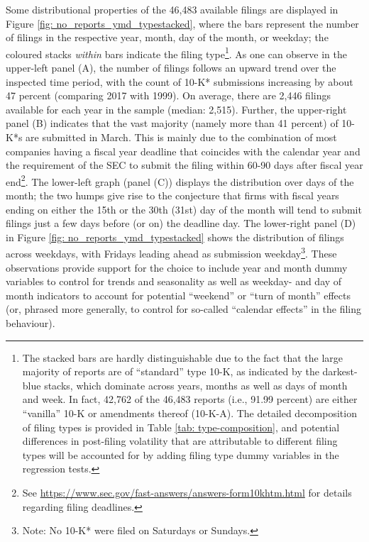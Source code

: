 Some distributional properties of the 46,483 available filings are displayed in Figure \ref{fig: no_reports_ymd_typestacked}, where the bars represent the number of filings in the respective year, month, day of the month, or weekday; the coloured stacks \textit{within} bars indicate the filing type\footnote{The stacked bars are hardly distinguishable due to the fact that the large majority of reports are of \enquote{standard} type 10-K, as indicated by the darkest-blue stacks, which dominate across years, months as well as days of month and week. In fact, 42,762 of the 46,483 reports (i.e., 91.99 percent) are either \enquote{vanilla} 10-K or amendments thereof (10-K-A). The detailed decomposition of filing types is provided in Table \ref{tab: type-composition}, and potential differences in post-filing volatility that are attributable to different filing types will be accounted for by adding filing type dummy variables in the regression tests.}. As one can observe in the upper-left panel (A), the number of filings follows an upward trend over the inspected time period, with the count of 10-K* submissions increasing by about 47 percent (comparing 2017 with 1999). On average, there are 2,446 filings available for each year in the sample (median: 2,515). Further, the upper-right panel (B) indicates that the vast majority (namely more than 41 percent) of 10-K*s are submitted in March. This is mainly due to the combination of most companies having a fiscal year deadline that coincides with the calendar year and the requirement of the SEC to submit the filing within 60-90 days after fiscal year end\footnote{See \url{https://www.sec.gov/fast-answers/answers-form10khtm.html} for details regarding filing deadlines.}. The lower-left graph (panel (C)) displays the distribution over days of the month; the two humps give rise to the conjecture that firms with fiscal years ending on either the 15th or the 30th (31st) day of the month will tend to submit filings just a few days before (or on) the deadline day. The lower-right panel (D) in Figure \ref{fig: no_reports_ymd_typestacked} shows the distribution of filings across weekdays, with Fridays leading ahead as submission weekday\footnote{Note: No 10-K* were filed on Saturdays or Sundays.}. These observations provide support for the choice to include year and month dummy variables to control for trends and seasonality as well as weekday- and day of month indicators to account for potential \enquote{weekend} or \enquote{turn of month} effects (or, phrased more generally, to control for so-called \enquote{calendar effects} in the filing behaviour). 

